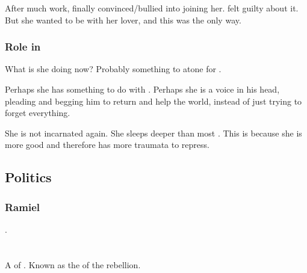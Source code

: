 After much work, \Shiaraid{} finally convinced/bullied \Eryal{} into joining her. 
\Eryal{} felt guilty about it. 
But she wanted to be with her lover, and this was the only way. 





\subsubsection{Role in \SentinelsofMiithEmph}
What is she doing now? 
Probably something to atone for .

Perhaps she has something to do with \Sithiyacaan. 
Perhaps she is a voice in his head, pleading and begging him to return and help the world, instead of just trying to forget everything. 

She is not incarnated again. 
She sleeps deeper than most \malachim. 
This is because she is more good and therefore has more traumata to repress. 









\subsection{Politics}





\subsubsection{Ramiel}
. 















\section{\Kezrabal}
\index{\Kezrabal} 
A \resphan{} of \Merkyrah.
Known as the  of the \Merkyran{} rebellion. 









